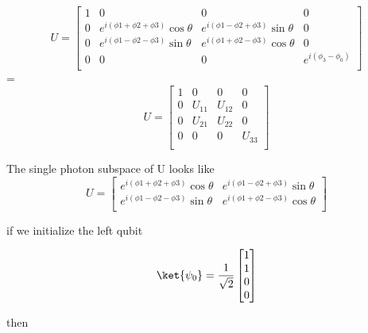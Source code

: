 \begin{equation}
    U=
    \begin{bmatrix}
        1 & 0 & 0 & 0 \\
        0 & e^{ i (\phi{1} + \phi{2} + \phi{3})}\cos{\theta} & e^{ i (\phi{1} - \phi{2} + \phi{3})}\sin{\theta} & 0 \\
        0 & e^{ i (\phi{1} - \phi{2} - \phi{3})}\sin{\theta} & e^{ i (\phi{1} + \phi{2} - \phi{3})}\cos{\theta} & 0 \\
        0 & 0 & 0 & e^{i (\phi_{3}-\phi_{0})} \\
    \end{bmatrix}
\end{equation}=
\begin{equation}
    U=
    \begin{bmatrix}
        1 & 0 & 0 & 0 \\
        0 & U_{11} & U_{12} & 0 \\
        0 & U_{21} & U_{22} & 0 \\
        0 & 0 & 0 & U_{33} \\
    \end{bmatrix}
\end{equation}


The single photon subspace of U looks like
\begin{equation}
    U=
    \begin{bmatrix}
        e^{ i (\phi{1} + \phi{2} + \phi{3})}\cos{\theta} & e^{ i (\phi{1} - \phi{2} + \phi{3})}\sin{\theta} \\
        e^{ i (\phi{1} - \phi{2} - \phi{3})}\sin{\theta} & e^{ i (\phi{1} + \phi{2} - \phi{3})}\cos{\theta} \\
    \end{bmatrix}
\end{equation}


if we initialize the left qubit

\begin{equation}
    \ket{\psi_0}=\frac{1}{\sqrt{2}}
    \begin{bmatrix}
        1 \\
        1 \\
        0 \\
        0 \\
    \end{bmatrix}
\end{equation}

then

